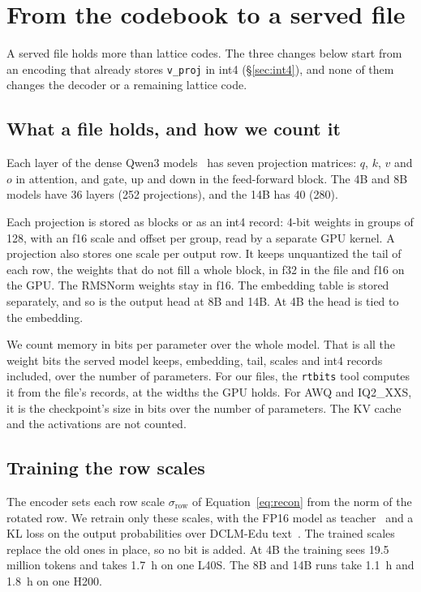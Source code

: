 \section{From the codebook to a served file}
\label{sec:model}

A served file holds more than lattice codes. The three changes below start
from an encoding that already stores \texttt{v\_proj} in int4
(\S\ref{sec:int4}), and none of them changes the decoder or a remaining lattice
code.

\subsection{What a file holds, and how we count it}
\label{sec:file}

Each layer of the dense Qwen3 models~\citep{qwen3_2025} has seven projection
matrices: $q$, $k$, $v$ and $o$ in attention, and gate, up and down in the
feed-forward block. The 4B and 8B models have 36 layers (252 projections), and
the 14B has 40 (280).

Each projection is stored as \Tetra{} blocks or as an int4 record: 4-bit
weights in groups of 128, with an f16 scale and offset per group, read by a
separate GPU kernel. A \Tetra{} projection also stores one scale per output
row. It keeps unquantized the tail of each row, the weights that do not fill a
whole block, in f32 in the file and f16 on the GPU. The RMSNorm weights stay in
f16. The embedding table is stored separately, and so is the output head at 8B
and 14B. At 4B the head is tied to the embedding.

We count memory in bits per parameter over the whole model. That is all the
weight bits the served model keeps, embedding, tail, scales and int4 records included,
over the number of parameters. For our files, the \texttt{rtbits} tool
computes it from the file's records, at the widths the GPU holds. For AWQ and
IQ2\_XXS, it is the checkpoint's size in bits over the number of parameters.
The KV cache and the activations are not counted.

\subsection{Training the row scales}
\label{sec:rowscales}

The encoder sets each row scale $\sigma_{\mathrm{row}}$ of
Equation~\eqref{eq:recon} from the norm of the rotated row. We retrain only
these scales, with the FP16 model as teacher~\citep{hinton2015} and a KL loss
on the output probabilities over DCLM-Edu text~\citep{dclmedu}. The trained
scales replace the old ones in place, so no bit is added. At 4B the training
sees 19.5 million tokens and takes 1.7~h on one L40S. The 8B and 14B runs take
1.1~h and 1.8~h on one H200.

